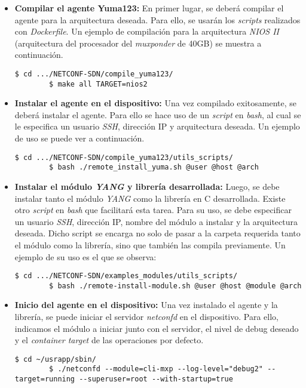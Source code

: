 \begin{itemize}   
    \item \textbf{Compilar el agente Yuma123:} En primer lugar, se deberá compilar el agente para la arquitectura deseada. Para ello, se usarán los \textit{scripts} realizados con \textit{Dockerfile}. Un ejemplo de compilación para la arquitectura \textit{NIOS II} (arquitectura del procesador del \textit{muxponder} de 40GB) se muestra a continuación.
	
	\begin{lstlisting}[language=SHELXL]
		$ cd .../NETCONF-SDN/compile_yuma123/
		$ make all TARGET=nios2
    \end{lstlisting}

    \item \textbf{Instalar el agente en el dispositivo:} Una vez compilado exitosamente, se deberá instalar el agente. Para ello se hace uso de un \textit{script} en \textit{bash}, al cual se le especifica un usuario \textit{SSH}, dirección IP y arquitectura deseada. Un ejemplo de uso se puede ver a continuación.
    
	\begin{lstlisting}[language=SHELXL]
		$ cd .../NETCONF-SDN/compile_yuma123/utils_scripts/
		$ bash ./remote_install_yuma.sh @user @host @arch
    \end{lstlisting}
	
    \item \textbf{Instalar el módulo \textit{YANG} y librería desarrollada:} Luego, se debe instalar tanto el módulo \textit{YANG} como la librería en C desarrollada. Existe otro \textit{script} en \textit{bash} que facilitará esta tarea. Para su uso, se debe especificar un usuario \textit{SSH}, dirección IP, nombre del módulo a instalar y la arquitectura deseada. Dicho script se encarga no solo de pasar a la carpeta requerida tanto el módulo como la librería, sino que también las compila previamente. Un ejemplo de su uso es el que se observa:
	
	\begin{lstlisting}[language=SHELXL]
		$ cd .../NETCONF-SDN/examples_modules/utils_scripts/
		$ bash ./remote-install-module.sh @user @host @module @arch
    \end{lstlisting}

    \item \textbf{Inicio del agente en el dispositivo:} Una vez instalado el agente y la librería, se puede iniciar el servidor \textit{netconfd} en el dispositivo. Para ello, indicamos el módulo a iniciar junto con el servidor, el nivel de debug deseado y el \textit{container target} de las operaciones por defecto.
	\begin{lstlisting}[language=SHELXL]
		$ cd ~/usrapp/sbin/
		$ ./netconfd --module=cli-mxp --log-level="debug2" --target=running --superuser=root --with-startup=true
    \end{lstlisting}
  
\end{itemize}

